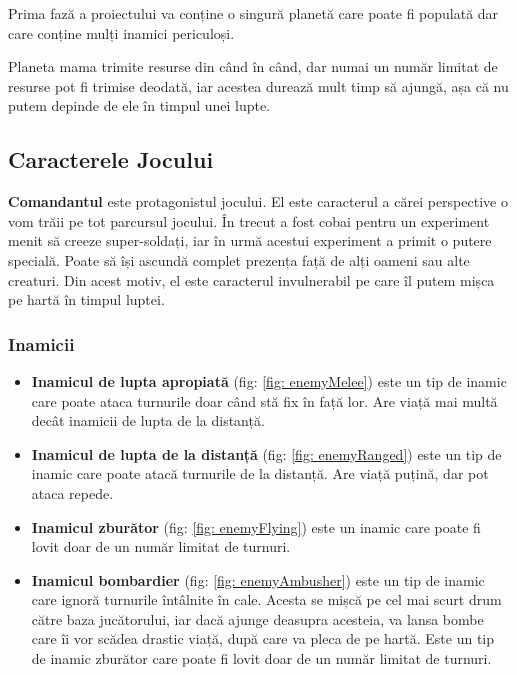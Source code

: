 \documentclass[12pt, a4paper]{article}
\begin{document}
	Prima fază a proiectului va conține o singură planetă care poate fi populată dar care conține mulți inamici periculoși.
	\newline
	
	Planeta mama trimite resurse din când în când, dar numai un număr limitat de resurse pot fi trimise deodată, iar acestea durează mult timp să ajungă, așa că nu putem depinde de ele în timpul unei lupte.
	
	
	
	
	
	\subsection{Caracterele Jocului}
	
	\textbf{Comandantul} este protagonistul jocului. El este caracterul a cărei perspective o vom trăii pe tot parcursul jocului. În trecut a fost cobai pentru un experiment menit să creeze super-soldați, iar în urmă acestui experiment a primit o putere specială. Poate să își ascundă complet prezența față de alți oameni sau alte creaturi. Din acest motiv, el este caracterul invulnerabil pe care îl putem mișca pe hartă în timpul luptei.
	
	
	
	
	
	\subsubsection{Inamicii}
	\begin{itemize}
		\item \textbf{Inamicul de lupta apropiată} (fig: \ref{fig: enemyMelee}) este un tip de inamic care poate ataca turnurile doar când stă fix în față lor. Are viață mai multă decât inamicii de lupta de la distanță.
		\item \textbf{Inamicul de lupta de la distanță} (fig: \ref{fig: enemyRanged}) este un tip de inamic care poate atacă turnurile de la distanță. Are viață puțină, dar pot ataca repede.
		\item \textbf{Inamicul zburător} (fig: \ref{fig: enemyFlying}) este un inamic care poate fi lovit doar de un număr limitat de turnuri.
		\item \textbf{Inamicul bombardier} (fig: \ref{fig: enemyAmbusher}) este un tip de inamic care ignoră turnurile întâlnite în cale. Acesta se mișcă pe cel mai scurt drum către baza jucătorului, iar dacă ajunge deasupra acesteia, va lansa bombe care îi vor scădea drastic viață, după care va pleca de pe hartă. Este un tip de inamic zburător care poate fi lovit doar de un număr limitat de turnuri.
	\end{itemize}
	
\end{document}
